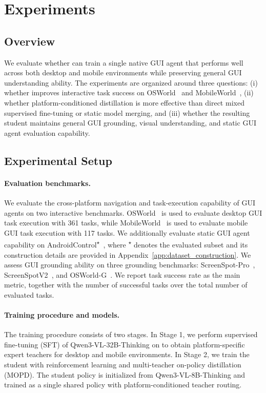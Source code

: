 \section{Experiments}
\label{sec:experiments}

\subsection{Overview}
\label{sec:exp_overview}

We evaluate whether \METHODNAME can train a single native GUI agent that
performs well across both desktop and mobile environments while preserving
general GUI understanding ability. The experiments are organized around
three questions: (i) whether \METHODNAME improves interactive task success
on OSWorld~\citep{osworld} and MobileWorld~\citep{mobileworld}, (ii) whether platform-conditioned distillation is
more effective than direct mixed supervised fine-tuning or static model
merging, and (iii) whether the resulting student maintains general GUI
grounding, visual understanding, and static GUI agent evaluation capability.

\subsection{Experimental Setup}
\label{sec:exp_setup}


\paragraph{Evaluation benchmarks.}
We evaluate the cross-platform navigation and task-execution capability of
GUI agents on two interactive benchmarks. OSWorld~\citep{osworld} is used to evaluate desktop GUI task execution
with 361 tasks, while MobileWorld~\citep{mobileworld} is used to evaluate mobile GUI task execution
with 117 tasks. We additionally evaluate static GUI agent capability on
AndroidControl\textsuperscript{$\star$}~\cite{androidcontrol}, where
\textsuperscript{$\star$} denotes the evaluated subset and its construction
details are provided in Appendix~\ref{app:dataset_construction}. We assess GUI
grounding ability on three grounding benchmarks: ScreenSpot-Pro~\cite{Screenspot-pro}, ScreenSpotV2~\citep{screenspotv2}, and OSWorld-G~\citep{osworld-g}. We
report task success rate as the main metric, together with the number of
successful tasks over the total number of evaluated tasks.


\paragraph{Training procedure and models.}
The training procedure consists of two stages. In Stage 1, we perform
supervised fine-tuning (SFT) of Qwen3-VL-32B-Thinking on
\BENCH to obtain platform-specific expert teachers for desktop and mobile
environments. In Stage 2, we train the student with reinforcement learning
and multi-teacher on-policy distillation (MOPD). The student policy is
initialized from Qwen3-VL-8B-Thinking and trained as a single shared
policy with platform-conditioned teacher routing.

